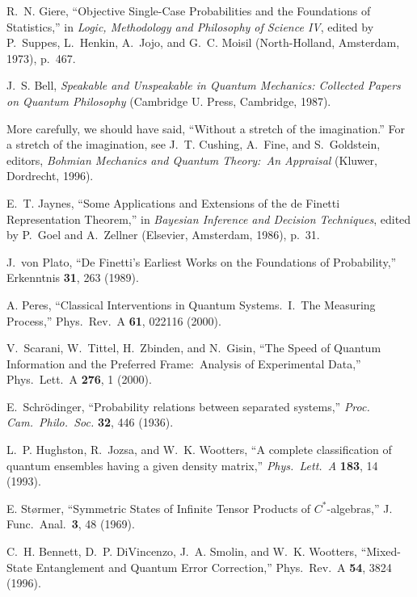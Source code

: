 \begin{thebibliography}{10}
R.~N. Giere, ``Objective Single-Case Probabilities and the Foundations
of Statistics,'' in {\sl Logic, Methodology and Philosophy of Science
IV}, edited by P.~Suppes, L.~Henkin, A.~Jojo, and G.~C. Moisil
(North-Holland, Amsterdam, 1973), p.~467.

J.~S. Bell, {\sl Speakable and Unspeakable in Quantum Mechanics:
Collected Papers on Quantum Philosophy\/} (Cambridge U. Press,
Cambridge, 1987).

More carefully, we should have said, ``Without a stretch of the
imagination.''  For a stretch of the imagination, see J.~T. Cushing,
A.~Fine, and S.~Goldstein, editors, {\sl  Bohmian Mechanics and Quantum
Theory:\ An Appraisal\/} (Kluwer, Dordrecht, 1996).

E.~T. Jaynes, ``Some Applications and Extensions of the de Finetti
Representation Theorem,'' in {\sl Bayesian Inference and Decision
Techniques}, edited by P.~Goel and A.~Zellner (Elsevier, Amsterdam,
1986), p.~31.

J.~von Plato, ``De Finetti's Earliest Works on the Foundations of
Probability,'' Erkenntnis {\bf 31}, 263 (1989).

A. Peres, ``Classical Interventions in Quantum Systems.\ I.\ The
Measuring Process,'' Phys.\ Rev.\ A {\bf 61}, 022116 (2000).

V.~Scarani, W.~Tittel, H.~Zbinden, and N.~Gisin, ``The Speed of Quantum
Information and the Preferred Frame:~Analysis of Experimental Data,''
Phys.\ Lett.\ A {\bf 276}, 1 (2000).

E.~Schr\"odinger, ``Probability relations between separated
systems,'' {\it Proc. Cam.\ Philo.\ Soc.} {\bf 32}, 446 (1936).

L.~P. Hughston, R.~Jozsa, and W.~K. Wootters, ``A complete
classification of quantum ensembles having a given density
matrix,'' {\it Phys.\ Lett.~A\/} {\bf 183}, 14 (1993).

E. St{\o}rmer, ``Symmetric States of Infinite Tensor Products of
$C^*$-algebras,'' J. Func.\ Anal.\ {\bf 3}, 48 (1969).

C.~H. Bennett, D.~P. DiVincenzo, J.~A. Smolin, and W.~K. Wootters,
``Mixed-State Entanglement and Quantum Error Correction,'' Phys.\
Rev.\ A {\bf 54}, 3824 (1996).


\end{thebibliography}
